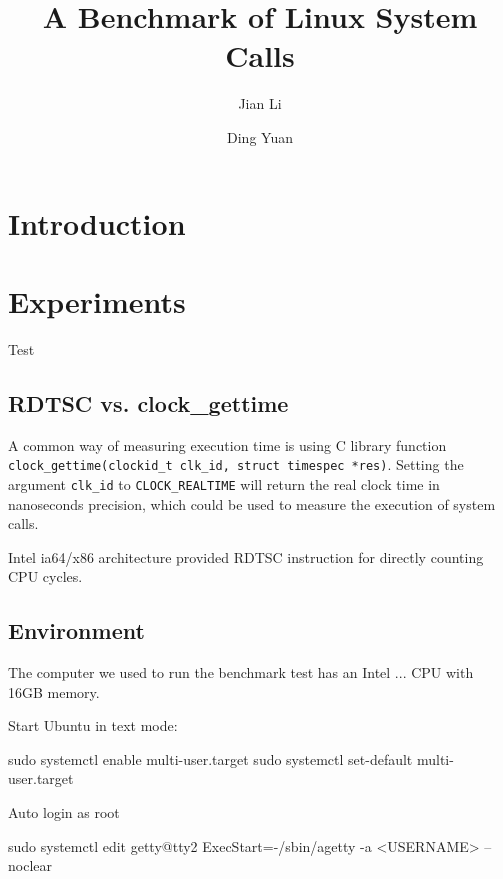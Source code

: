 \documentclass{article}
\begin{document}
\title{A Benchmark of Linux System Calls}
\author{Jian Li \and Ding Yuan}
\maketitle

\section{Introduction}

\section{Experiments}

Test 

\subsection{RDTSC vs. clock\_gettime}

A common way of measuring execution time is using C library function \lstinline{clock_gettime(clockid_t clk_id, struct timespec *res)}.
Setting the argument \lstinline{clk_id} to \lstinline{CLOCK_REALTIME} will return the real clock time in nanoseconds precision,
which could be used to measure the execution of system calls.

Intel ia64/x86 architecture provided RDTSC instruction for directly counting CPU cycles. 


\subsection{Environment}

The computer we used to run the benchmark test has an Intel ... CPU with 16GB memory.

Start Ubuntu in text mode:

sudo systemctl enable multi-user.target
sudo systemctl set-default multi-user.target

Auto login as root

sudo systemctl edit getty@tty2
ExecStart=-/sbin/agetty -a <USERNAME> --noclear %
\end{document}
